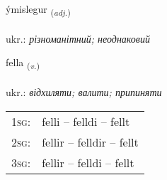 \documentclass[frontgrid, backgrid]{flacards}\usepackage[]{graphicx}\usepackage[]{xcolor}
\begin{document}
\renewcommand{\flhead}{\vskip5pt \fboxsep=0pt {\small\bfseries\footnotesize Lýsingarorð | прикметник}}
\renewcommand{\fcfoot}{\vskip5pt \fboxsep=0pt \hspace{2pt}{\small\bfseries\footnotesize 2K}}

\renewcommand{\blhead}{\vskip5pt {\small\bfseries\footnotesize Lýsingarorð | прикметник }}
\renewcommand{\bcfoot}{\vskip5pt \hspace{2pt}{\small\bfseries\footnotesize 2K}}


{ýmislegur \small{\textsubscript{(\textit{adj.})}} \\[1ex] %
\textphonetic{[iːmɪstlɛɣʏr]} \\
ukr.: \emph{різноманітний; неоднаковий} \\  [2ex]
\renewcommand*{\arraystretch}{0.8}
}

\renewcommand{\flhead}{\vskip5pt \fboxsep=0pt {\small\bfseries\footnotesize Sagnorð | дієслово}}
\renewcommand{\fcfoot}{\vskip5pt \fboxsep=0pt \hspace{2pt}{\small\bfseries\footnotesize 2K}}

\renewcommand{\blhead}{\vskip5pt {\small\bfseries\footnotesize Sagnorð | дієслово }}
\renewcommand{\bcfoot}{\vskip5pt \hspace{2pt}{\small\bfseries\footnotesize 2K}}


{fella \small{\textsubscript{(\textit{v.})}} \\[1ex] %
\textphonetic{[fɛtla]} \\
ukr.: \emph{відхиляти; валити; припиняти} \\  [2ex]
\renewcommand*{\arraystretch}{0.8}
\begin{tabular}{p{1cm}l}
\textsc{1sg}: & felli -- felldi -- fellt \\ 
\textsc{2sg}: & fellir -- felldir -- fellt \\ 
\textsc{3sg}: & fellir -- felldi -- fellt \\ 
\end{tabular}
}
\end{document}
